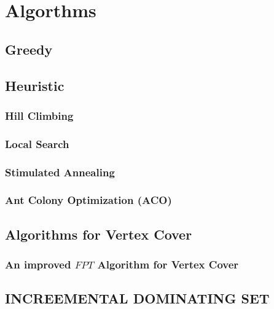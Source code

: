 \chapter{Algorthms}\label{chap:alg}
\section{Greedy} \label{sec:greedy}
\section{Heuristic} \label{sec:heuristic}
\subsection{Hill Climbing} \label{subsec:hillclimbing}
\subsection{Local Search} \label{subsec:localsearch}
\subsection{Stimulated Annealing} \label{subsec:stmanl}
\subsection{Ant Colony Optimization (ACO)} \label{subsec:aco} 
\section{Algorithms for Vertex Cover}
\subsection{An improved ${FPT}$ Algorithm for Vertex Cover} \label{subsec:fptvc}

\section{\large{I}\normalsize{NCREEMENTAL} \large{D}\normalsize{OMINATING} \Large{S}\normalsize{ET}} \label{sec:set}
